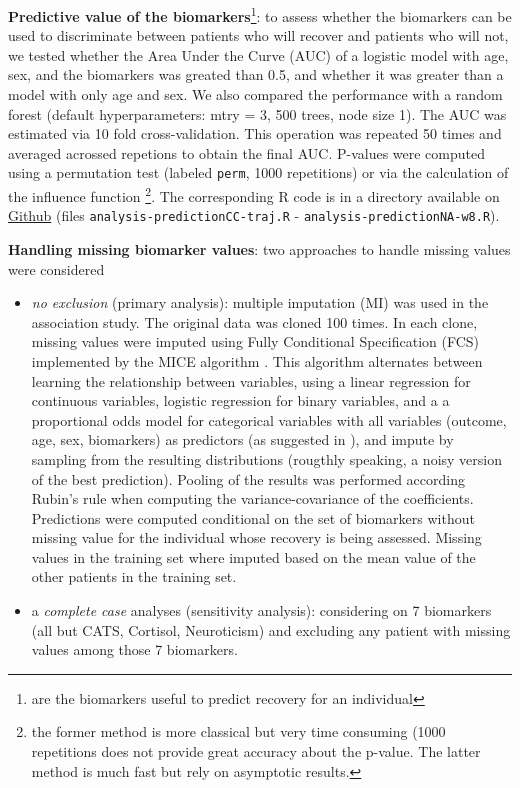 \documentclass[12pt]{article}
\begin{document}
\noindent \textbf{Predictive value of the biomarkers}\footnote{are the biomarkers
 useful to predict recovery for an individual}: to assess whether the
 biomarkers can be used to discriminate between patients who will
 recover and patients who will not, we tested whether the Area Under
 the Curve (AUC) of a logistic model with age, sex, and the biomarkers
 was greated than 0.5, and whether it was greater than a model with
 only age and sex. We also compared the performance with a random
 forest (default hyperparameters: mtry = 3, 500 trees, node size
 1). The AUC was estimated via 10 fold cross-validation. This
 operation was repeated 50 times and averaged acrossed repetions to
 obtain the final AUC. P-values were computed using a permutation test
 (labeled \texttt{perm}, 1000 repetitions) or via the calculation of the
 influence function \citep{ledell2015computationally}\footnote{the former
 method is more classical but very time consuming (1000 repetitions
 does not provide great accuracy about the p-value. The latter method
 is much fast but rely on asymptotic results.}. The corresponding R
 code is in a directory available on \href{https://github.com/bozenne/article-predictionNP1BD3/tree/master/code-data-analysis}{Github} (files
 \texttt{analysis-predictionCC-traj.R} - \texttt{analysis-predictionNA-w8.R}).

\bigskip

\noindent \textbf{Handling missing biomarker values}: two approaches to handle
missing values were considered
\begin{itemize}
\item \emph{no exclusion} (primary analysis): multiple imputation (MI) was used
in the association study. The original data was cloned 100 times. In
each clone, missing values were imputed using Fully Conditional
Specification (FCS) implemented by the MICE algorithm
\citep{van2011mice}. This algorithm alternates between learning the
relationship between variables, using a linear regression for
continuous variables, logistic regression for binary variables, and
a a proportional odds model for categorical variables with all
variables (outcome, age, sex, biomarkers) as predictors (as
suggested in \cite{moons2006using}), and impute by sampling from the
resulting distributions (rougthly speaking, a noisy version of the
best prediction). Pooling of the results was performed according
Rubin's rule when computing the variance-covariance of the
coefficients. \newline Predictions were computed conditional on the
set of biomarkers without missing value for the individual whose
recovery is being assessed. Missing values in the training set where
imputed based on the mean value of the other patients in the
training set.

\item a \emph{complete case} analyses (sensitivity analysis): considering on 7
biomarkers (all but CATS, Cortisol, Neuroticism) and excluding any
patient with missing values among those 7 biomarkers.
\end{itemize}
\end{document}
